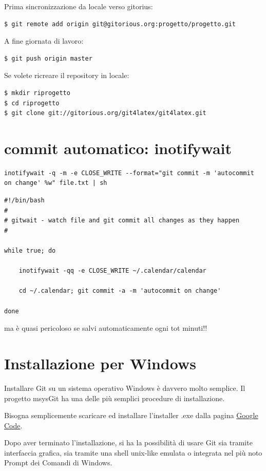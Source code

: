 \documentclass[a4paper,12pt,oneside]{article}
\begin{document}
Prima sincronizzazione da locale verso gitorius:
\begin{lstlisting}
$ git remote add origin git@gitorious.org:progetto/progetto.git
\end{lstlisting}

A fine giornata di lavoro:
\begin{lstlisting}
$ git push origin master
\end{lstlisting}

Se volete ricreare il repository in locale:
\begin{lstlisting}
$ mkdir riprogetto
$ cd riprogetto
$ git clone git://gitorious.org/git4latex/git4latex.git
\end{lstlisting}

\section{commit automatico: inotifywait}

\begin{lstlisting}
inotifywait -q -m -e CLOSE_WRITE --format="git commit -m 'autocommit on change' %w" file.txt | sh
\end{lstlisting}

\begin{lstlisting}
#!/bin/bash
#
# gitwait - watch file and git commit all changes as they happen
#

while true; do

    inotifywait -qq -e CLOSE_WRITE ~/.calendar/calendar

    cd ~/.calendar; git commit -a -m 'autocommit on change'

done
\end{lstlisting}
ma è quasi pericoloso se salvi automaticamente ogni tot minuti!!

\section{Installazione per Windows}
\label{sec:gitwin}

Installare Git su un sistema operativo Windows è davvero molto
semplice. Il progetto \textsf{msysGit} ha una delle più semplici
procedure di installazione.

Bisogna semplicemente scaricare ed installare l'installer
\textsf{.exe} dalla pagina
\href{http://code.google.com/p/msysgit}{Google Code}.

Dopo aver terminato l'installazione, si ha la possibilità di usare Git
sia tramite interfaccia grafica, sia tramite una shell unix-like
emulata o integrata nel più noto Prompt dei Comandi di Windows.
\end{document}
